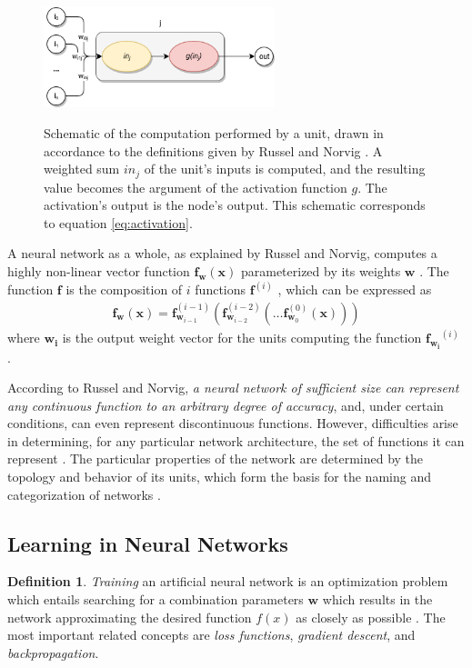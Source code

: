 \documentclass[12pt, titlepage]{report}
\theoremstyle{definition}
\newtheorem{definition}{Definition}
\begin{document}
\begin{figure}
\centering
\includegraphics[width=0.6\textwidth]{img/neuron.png}\\
\caption{Schematic of the computation performed by a unit, drawn in accordance to the definitions given by Russel and Norvig \cite[p.728]{russel2009artificial}. A weighted sum $in_j$ of the unit's inputs is computed, and the resulting value becomes the argument of the activation function $g$. The activation's output is the node's output. This schematic corresponds to equation \ref{eq:activation}.}
\label{figure:neural_unit}
\end{figure}

A neural network as a whole, as explained by Russel and Norvig, computes a highly non-linear vector function $\bm{f}_{\bm{w}}(\bm{x})$ parameterized by its weights $\bm{w}$ \cite[p. 731, 732]{russel2009artificial}. The function $\bm{f}$ is the composition of $i$ functions $\bm{f}^{(i)}$ \cite[p. 164]{goodfellow2016deep}, which can be expressed as
 \begin{gather}\label{eq:neural_net_composition}
 \bm{f_w}(\bm{x}) = \bm{f}_{\bm{w}_{i-1}}^{(i-1)} (\bm{f}_{\bm{w}_{i-2}}^{(i-2)} ( \ldots \bm{f}_{\bm{w}_{0}}^{(0)}(\bm{x})))
\end{gather}
where $\bm{w_i}$ is the output weight vector for the units computing the function $\bm{f_{w_i}}^{(i)}$ \cite{goodfellow2016deep}.

According to Russel and Norvig, \emph{a neural network of sufficient size can represent any continuous function to an arbitrary degree of accuracy}, and, under certain conditions, can even represent discontinuous functions. However, difficulties arise in determining, for any particular network architecture, the set of functions it can represent \cite[p. 732]{russel2009artificial}. The particular properties of the network are determined by the topology and behavior of its units, which form the basis for the naming and categorization of networks \cite[p. 729]{russel2009artificial}.


\subsection{Learning in Neural Networks}
\begin{definition}
\emph{Training} an artificial neural network is an optimization problem which entails searching for a combination parameters $\bm{w}$ which results in the network approximating the desired function $f(x)$ as closely as possible \cite[p. 718]{russel2009artificial}. The most important related concepts are \emph{loss functions}, \emph{gradient descent}, and \emph{backpropagation}.
\end{definition}
\end{document}
